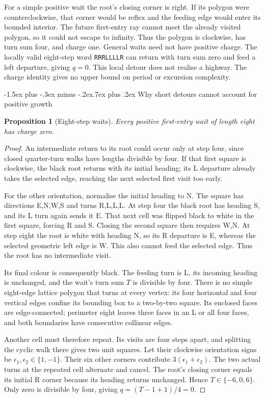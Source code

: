 \documentclass[11pt,letterpaper]{article}
\makeatletter
\renewcommand\subsection{\@startsection{subsection}{2}{\z@}%
  {-1.5ex plus -.3ex minus -.2ex}{.7ex plus .2ex}%
  {\normalfont\large\bfseries}}
\newtheorem{proposition}[theorem]{Proposition}
\makeatother
\begin{document}
For a simple positive wait the root's closing corner is right. If its
polygon were counterclockwise, that corner would be reflex and the feeding
edge would enter its bounded interior. The future first-entry ray cannot
meet the already visited polygon, so it could not escape to infinity.
Thus the polygon is clockwise, has turn sum four, and charge one.
General waits need not have positive charge.
The locally valid eight-step word \texttt{RRRLLLLR} can return with
turn sum zero and feed a left departure, giving $q=0$. This local detour does not realise a highway. The charge identity gives
no upper bound on period or excursion complexity.

\subsection{Why short detours cannot account for positive growth}
\begin{proposition}[Eight-step waits]
Every positive first-entry wait of length eight has charge zero.
\end{proposition}
\begin{proof}
An intermediate return to its root could occur only at step four, since
closed quarter-turn walks have lengths divisible by four. If that first
square is clockwise, the black root returns with its initial heading;
its L departure already takes the selected edge, reaching the next
selected first visit too early.

For the other orientation, normalise the initial heading to N. The
square has directions E,N,W,S and turns R,L,L,L. At step four the
black root has heading S, and its L turn again sends it E. That next
cell was flipped black to white in the first square, forcing R and S.
Closing the second square then requires W,N. At step eight the root is
white with heading N, so its R departure is E, whereas the selected
geometric left edge is W. This also cannot feed the selected edge.
Thus the root has no intermediate visit.

Its final colour is consequently black. The feeding turn is L, its
incoming heading is unchanged, and the wait's turn sum $T$ is divisible
by four. There is no simple eight-edge lattice polygon that turns at
every vertex: its four horizontal and four vertical edges confine its
bounding box to a two-by-two square. Its enclosed faces are edge-connected;
perimeter eight leaves three faces in an L or all four faces, and
both boundaries have consecutive collinear edges.

Another cell must therefore repeat. Its visits are four steps apart,
and splitting the cyclic walk there gives two unit squares. Let their
clockwise orientation signs be $\epsilon_1,\epsilon_2\in\{1,-1\}$.
Their six other corners contribute $3(\epsilon_1+\epsilon_2)$.
The two actual turns at the repeated cell alternate and cancel.
The root's closing corner equals its initial R corner because its
heading returns unchanged. Hence $T\in\{-6,0,6\}$. Only zero is
divisible by four, giving $q=(T-1+1)/4=0$.
\end{proof}
\end{document}
